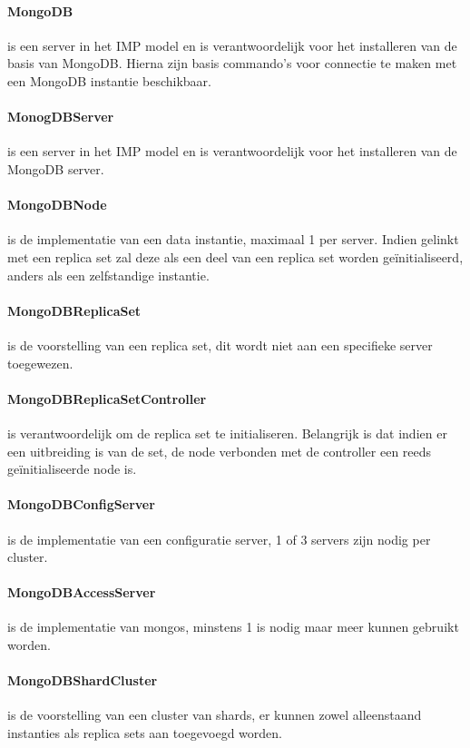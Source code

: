 \documentclass[]{article}
\begin{document}
	\paragraph{MongoDB} is een server in het IMP model en is verantwoordelijk voor het installeren van de basis van MongoDB. Hierna zijn basis commando's voor connectie te maken met een MongoDB instantie beschikbaar. 
	\paragraph{MonogDBServer} is een server in het IMP model en is verantwoordelijk voor het installeren van de MongoDB server. 
	\paragraph{MongoDBNode} is de implementatie van een data instantie, maximaal 1 per server. Indien gelinkt met een replica set zal deze als een deel van een replica set worden geïnitialiseerd, anders als een zelfstandige instantie. 
	\paragraph{MongoDBReplicaSet} is de voorstelling van een replica set, dit wordt niet aan een specifieke server toegewezen. 
	\paragraph{MongoDBReplicaSetController} is verantwoordelijk om de replica set te initialiseren. Belangrijk is dat indien er een uitbreiding is van de set, de node verbonden met de controller een reeds geïnitialiseerde node is.  
	\paragraph{MongoDBConfigServer} is de implementatie van een configuratie server, 1 of 3 servers zijn nodig per cluster. 
	\paragraph{MongoDBAccessServer} is de implementatie van mongos, minstens 1 is nodig maar meer kunnen gebruikt worden.
	\paragraph{MongoDBShardCluster} is de voorstelling van een cluster van shards, er kunnen zowel alleenstaand instanties als replica sets aan toegevoegd worden. 
\end{document}
